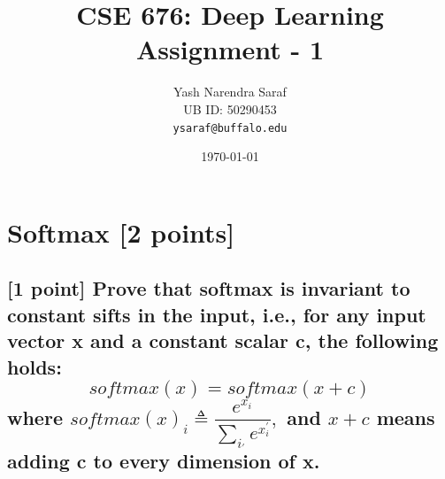 
\title{\Large CSE 676: Deep Learning\\\Huge Assignment - 1}
\date{\today}
\author{Yash Narendra Saraf\\UB ID: 50290453\\\texttt{ysaraf@buffalo.edu}}
\maketitle
\section{Softmax [2 points]}

\subsection{ [1 point] Prove that softmax is invariant to constant sifts in the input, i.e., for any
input vector x and a constant scalar c, the following holds: \\
$$ softmax(x) = softmax(x +c)  $$
 where $ softmax(x)_i \triangleq \dfrac{e^{x_i}}{\sum_{i_{'}}^{} e^{x_i^{'}}},$ and $ x +c $ means adding c to every dimension of x.}
 
